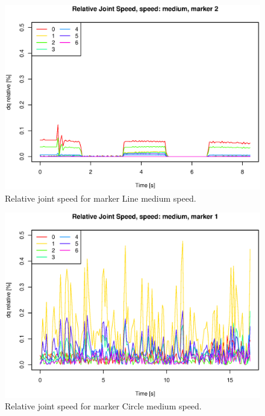 \begin{figure}[H]\centering\includegraphics[width=\fullImageWidth]{graphics/rovi_robot_joint_speed_medium_marker2.eps}  \caption{Relative joint speed for marker Line   medium speed.}\label{fig:rovi_joint_speed_M_Line  } \end{figure}
\begin{figure}[H]\centering\includegraphics[width=\fullImageWidth]{graphics/rovi_robot_joint_speed_medium_marker1.eps}  \caption{Relative joint speed for marker Circle medium speed.}\label{fig:rovi_joint_speed_M_Circle} \end{figure}
